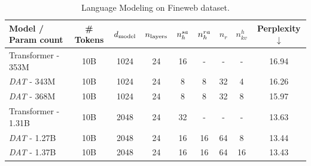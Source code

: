 \documentclass[letterpaper]{article}
\begin{document}
\begin{table}[]
    \centering
    \caption{Language Modeling on Fineweb dataset.}\label{tab:my-table}
    \begin{tabular}{@{}l|c|cccccc|c@{}}
    \toprule
    Model / Param count   & \# Tokens &$d_{\mathrm{model}}$&$n_{\mathrm{layers}}$& $n_h^{sa}$  & $n_h^{ra}$ & $n_r$ & $n_{kv}^{h}$ & Perplexity $\downarrow$ \\ \midrule\hline
    Transformer - 353M    & 10B       & 1024    & 24       & 16       & -        & -     & -           & 16.94     \\
    \textit{DAT} - 343M   & 10B       & 1024    & 24       & 8        & 8        & 32    & 4           & 16.26     \\
    \textit{DAT} - 368M   & 10B       & 1024    & 24       & 8        & 8        & 32    & 8           & 15.97     \\\midrule
    Transformer - 1.31B   & 10B       & 2048    & 24       & 32       & -        & -     & -           & 13.63     \\
    \textit{DAT} - 1.27B  & 10B       & 2048    & 24       & 16       & 16       & 64    & 8           & 13.44     \\
    \textit{DAT} - 1.37B  & 10B       & 2048    & 24       & 16       & 16       & 64    & 16          & 13.43     \\ \bottomrule
    \end{tabular}%
\end{table}
\end{document}
